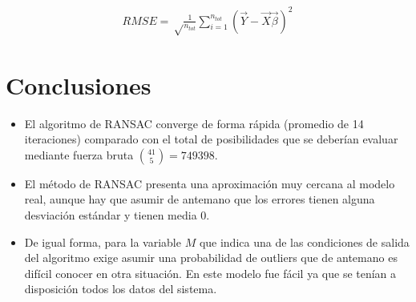 \documentclass{IEEEtran}
\begin{document}
\begin{equation*}
\begin{aligned}
RMSE = \sqrt \frac{1}{n_{tot}} \displaystyle\sum_{i=1}^{n_{tot}} (\vec{Y} - \vec{X}\vec{\beta})^2
\end{aligned}
\end{equation*} 

\section{Conclusiones}
\begin{itemize}
\item El algoritmo de RANSAC converge de forma 
rápida (promedio de 14 iteraciones)
comparado con el total de posibilidades
que se deberían evaluar mediante fuerza bruta
$\binom{41}{5} = 749398$.
\item El método de RANSAC presenta una aproximación
muy cercana al modelo real, aunque hay que asumir
de antemano que los errores tienen alguna desviación
estándar y tienen media 0.
\item De igual forma, para la variable $M$ que indica
una de las condiciones de salida del algoritmo exige
asumir una probabilidad de outliers que de antemano
es difícil conocer en otra situación. En este modelo
fue fácil ya que se tenían a disposición todos los datos
del sistema.
\end{itemize} 



\end{document}
